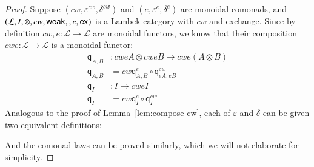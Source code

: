\documentclass{article}
\let\mto\to
\let\to\relax
\newcommand{\to}{\rightarrow}
\let\c\relax
\newcommand{\cat}[1]{\mathcal{#1}}
\newcommand{\w}[1]{\mathsf{weak}_{#1}}
\newcommand{\c}[1]{\mathsf{contra}_{#1}}
\newcommand{\e}[1]{\mathsf{ex}_{#1}}
\newcommand{\q}[1]{\mathsf{q}_{#1}}
\begin{document}
\begin{proof}
  Suppose $(cw,\varepsilon^{cw},\delta^{cw})$ and
  $(e,\varepsilon^e,\delta^e)$ are monoidal comonads, and \\
  $(\cat{L},I,\otimes,cw,\w{},\c{},e,\e{})$ is a
  Lambek category with $cw$ and exchange. Since by definition
  $cw,e:\cat{L}\mto\cat{L}$ are monoidal functors, we know that their
  composition \\
  $cwe:\cat{L}\mto\cat{L}$ is a monoidal functor:
  \begin{align*}
    \q{A,B} &: cweA\otimes cweB\mto cwe(A\otimes B)   \\
    \q{A,B} &= cw\q{A,B}^e\circ\q{eA,eB}^{cw}         \\
    \q{I}   &: I\mto cweI                             \\
    \q{I}   &= cw\q{I}^e\circ\q{I}^{cw}
  \end{align*}
  Analogous to the proof of Lemma~\ref{lem:compose-cw}, each of
  $\varepsilon$ and $\delta$ can be given two equivalent definitions:
  And the comonad laws can be proved similarly, which we will not elaborate
  for simplicity.
\end{proof}
\end{document}

